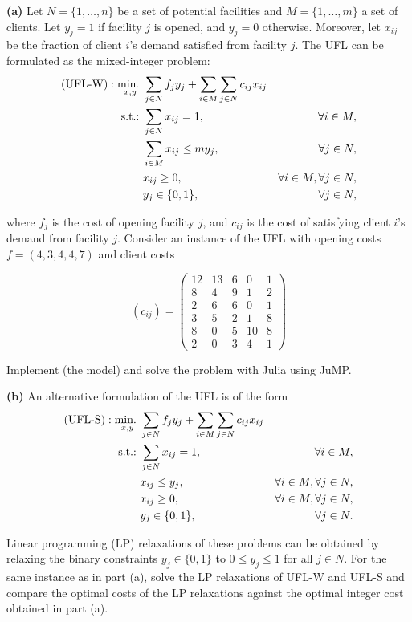\textbf{(a)}  Let $N = \{1,\dots,n\}$ be a set of potential facilities and $M = \{1,\dots,m\}$ a set of clients. Let $y_j = 1$ if facility $j$ is opened, and $y_j = 0$ otherwise. Moreover, let $x_{ij}$ be the fraction of client $i$'s demand satisfied from facility $j$. The UFL can be formulated as the mixed-integer problem: 
%
\begin{align}
 \text{(UFL-W)} : \mathop{\text{min.~}}_{x,y} & \sum_{j\in N} f_jy_j + \sum_{i\in M}\sum_{j\in N} c_{ij}x_{ij} \label{IP:1}\\
   \mathop{\text{s.t.:~}} & \sum_{j\in N}x_{ij} = 1, &\forall i \in M, \label{IP:2}\\
       & \sum_{i\in M}x_{ij} \leq my_j, &\forall  j \in N, \label{IP:3}\\
       & x_{ij} \geq 0, &\forall i \in M, \forall j \in N, \label{IP:4}\\
       & y_j \in \{0,1\}, &\forall j\in N, \label{IP:5}
\end{align}

where $f_j$ is the cost of opening facility $j$, and $c_{ij}$ is the cost of satisfying client $i$'s demand from facility $j$. Consider an instance of the UFL with opening costs $f=(4,3,4,4,7)$ and client costs

\begin{equation*}
 (c_{ij}) = \left(
	\begin{array}{ccccc}
		12 & 13 & 6 & 0  & 1 \\
		8  & 4  & 9 & 1  & 2 \\
		2  & 6  & 6 & 0  & 1 \\
		3  & 5  & 2 & 1  & 8 \\
		8  & 0  & 5 & 10 & 8 \\
		2  & 0  & 3 & 4  & 1
	\end{array}
 \right)
\end{equation*}

Implement (the model) and solve the problem with Julia using JuMP.

\textbf{(b)} An alternative formulation of the UFL is of the form
%
\begin{align}
 \text{(UFL-S)} : \mathop{\text{min.~}}_{x,y} &\sum_{j\in N}f_jy_j + \sum_{i\in M}\sum_{j\in N}c_{ij}x_{ij}\label{SIP:1}\\
       \mathop{\text{s.t.:~}} & \sum_{j\in N}x_{ij} = 1, &\forall i \in M,\label{SIP:2}\\
       & x_{ij} \leq y_j, &\forall  i\in M, \forall j \in N,\label{SIP:3}\\
       & x_{ij} \geq 0, &\forall i \in M, \forall j \in N,\label{SIP:4}\\
       & y_j \in \{0,1\}, &\forall j\in N.\label{SIP:5}
\end{align}


Linear programming (LP) relaxations of these problems can be obtained by relaxing the binary constraints $y_j\in \{0,1\}$ to $0 \leq y_j \leq 1$ for all $j \in N$. For the same instance as in part (a), solve the LP relaxations of UFL-W and UFL-S and compare the optimal costs of the LP relaxations against the optimal integer cost obtained in part (a).